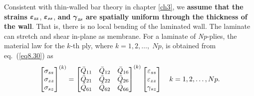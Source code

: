 \documentclass{AeroStructure-ERJohnson}
\begin{document}
Consistent with thin-walled bar theory in chapter \ref{ch3}, we
\textbf{assume that the strains} $\boldsymbol{\varepsilon}_{\textbf{\textit{zz}}}$,
$\boldsymbol{\varepsilon}_{\textbf{\textit{ss}}}$, \textbf{and} $\boldsymbol{\gamma}_{\textbf{\textit{zs}}}$ \textbf{are
spatially uniform through the thickness of the wall}. That is,
there is no local bending of the laminated wall. The laminate can
stretch and shear in-plane as membrane. For a laminate of
\textit{Np}-plies, the material law for the $k$-th ply, where
$k=1,2, \ldots,\; Np$, is obtained from eq.~(\ref{eq8.30}) as
\begin{align}\label{eq8.32}
\left[\begin{array}{@{}l@{}} \sigma_{s s}\\
\sigma_{z z}\\
\sigma_{s z} \end{array}\right]^{(k)}=\left[\begin{array}{@{}lll@{}}
\bar{Q}_{11} & \bar{Q}_{12} & \bar{Q}_{16}\\
\bar{Q}_{21} &
\bar{Q}_{22} & \bar{Q}_{26}\\
\bar{Q}_{61} & \bar{Q}_{62} &
\bar{Q}_{66} \end{array}\right]^{(k)}\left[\begin{array}{@{}c@{}}
\varepsilon_{s s}\\
\varepsilon_{z z}\\
\gamma_{s z}
\end{array}\right] \quad k=1,2, \ldots, N p.
\end{align}
\end{document}

